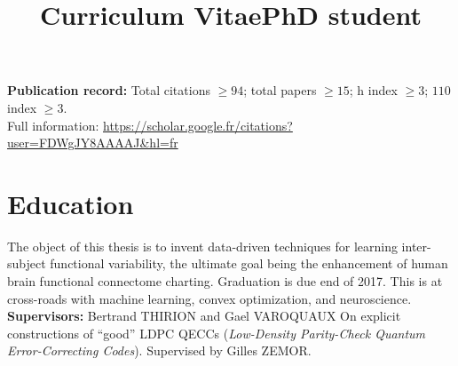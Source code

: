 \documentclass[11pt,a4paper,roman,unicode]{moderncv}
\title{Curriculum Vitae}
\title{PhD student}
\begin{document}
\maketitle
\textbf{Publication record:} Total citations $ \ge 94$; total papers $ \ge 15$; h index $ \ge 3$; $110$ index $ \ge 3$.\\
Full information: \url{https://scholar.google.fr/citations?user=FDWgJY8AAAAJ&hl=fr}
\section{Education}
        {The object of this thesis is to invent data-driven techniques for learning inter-subject functional variability, the ultimate goal being the enhancement of human brain functional connectome charting. Graduation is due end of 2017. This is at cross-roads with machine learning, convex optimization,
          and neuroscience.\\
          \textbf{Supervisors:} Bertrand THIRION and Gael VAROQUAUX}
{On explicit constructions of ``good'' LDPC QECCs (\emph{Low-Density Parity-Check Quantum Error-Correcting Codes}). Supervised by Gilles ZEMOR.}
{}
\end{document}

